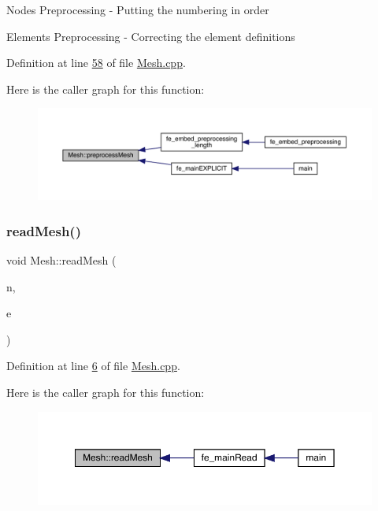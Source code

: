 Nodes Preprocessing -\/ Putting the numbering in order

Elements Preprocessing -\/ Correcting the element definitions 

Definition at line \hyperlink{_mesh_8cpp_source_l00058}{58} of file \hyperlink{_mesh_8cpp_source}{Mesh.\+cpp}.

Here is the caller graph for this function\+:\nopagebreak
\begin{figure}[H]
\begin{center}
\leavevmode
\includegraphics[width=350pt]{class_mesh_aa8a6f260e9589be4c0a2fcc146e696d5_icgraph}
\end{center}
\end{figure}
\mbox{\label{class_mesh_aba57df50d740f660cadf00aefe75e157}} 
\subsubsection{\texorpdfstring{read\+Mesh()}{readMesh()}}
{\footnotesize\ttfamily void Mesh\+::read\+Mesh (\begin{DoxyParamCaption}\item[{Matrix\+Xd}]{n,  }\item[{Matrix\+Xi}]{e }\end{DoxyParamCaption})}



Definition at line \hyperlink{_mesh_8cpp_source_l00006}{6} of file \hyperlink{_mesh_8cpp_source}{Mesh.\+cpp}.

Here is the caller graph for this function\+:\nopagebreak
\begin{figure}[H]
\begin{center}
\leavevmode
\includegraphics[width=350pt]{class_mesh_aba57df50d740f660cadf00aefe75e157_icgraph}
\end{center}
\end{figure}
\mbox{\label{class_mesh_a2193a797388525febbac794d17bea23e}} 

